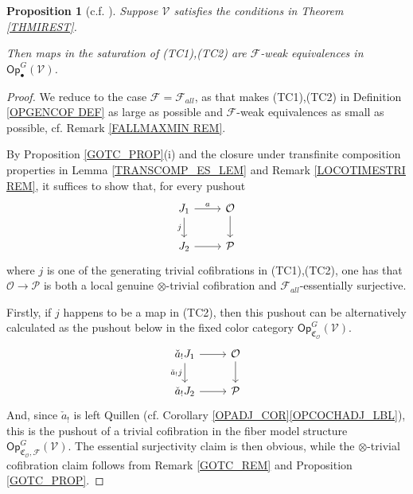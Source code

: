 \documentclass[a4paper,10pt
,draft
]{article}%
\numberwithin{equation}{section}
\numberwithin{figure}{section}
\newtheorem{proposition}[equation]{Proposition}%
\theoremstyle{definition} %
\newcommand{\F}{\ensuremath{\mathcal F}}
\newcommand{\V}{\ensuremath{\mathcal V}}
\renewcommand{\O}{\ensuremath{\mathcal O}}
\renewcommand{\P}{\ensuremath{\mathcal P}}
\newcommand{\1}{\ensuremath{\mathbbm 1}}%
\begin{document}
\begin{proposition}[{c.f. \cite[4.20]{Cav}}]\label{J_CELL_PROP}
	Suppose $\V$ satisfies the conditions in Theorem \ref{THMIREST}.
      
	Then maps in the saturation of (TC1),(TC2) 
	are $\F$-weak equivalences in $\mathsf{Op}^G_{\bullet}(\V)$.
\end{proposition}



\begin{proof}
	We reduce to the case $\F=\F_{all}$,
	as that makes (TC1),(TC2) in Definition \ref{OPGENCOF DEF} as large as possible 
	and $\mathcal{F}$-weak equivalences as small as possible,
	cf. Remark \ref{FALLMAXMIN REM}.
		
	By Proposition \ref{GOTC_PROP}(i)
	and the closure under transfinite composition properties in Lemma \ref{TRANSCOMP_ES_LEM} and Remark \ref{LOCOTIMESTRI REM},
	it suffices to show that, for every pushout
\begin{equation}\label{JUSTAPUSH EQ}
\begin{tikzcd}
	J_1 \ar{r}{a} \arrow{d}[swap]{j}
&
	\O \arrow{d}
\\
	J_2 \ar{r} 
&
	\P
\end{tikzcd}
\end{equation}
	where $j$ is one of the generating trivial cofibrations 
	in (TC1),(TC2),
	one has that 
	$\O \to \mathcal{P}$ is both a local genuine $\otimes$-trivial cofibration and $\F_{all}$-essentially surjective.

	Firstly, if $j$ happens to be a map in (TC2),
	then this pushout
	can be alternatively calculated as the pushout below
	in the fixed color category $\mathsf{Op}^{G}_{\mathfrak C_{\O}}(\V)$.
\begin{equation}
\begin{tikzcd}
\check{a}_!J_1 \ar{r} \arrow{d}[swap]{\check{a}_!j}
&
\O \arrow{d}
\\
\check{a}_!J_2 \ar{r} 
&
\P
\end{tikzcd}
\end{equation}      
      And, since $\check{a}_!$ is left Quillen (cf. Corollary \ref{OPADJ_COR}\ref{OPCOCHADJ_LBL}), %
      this is the pushout of a trivial cofibration in the fiber model structure
      $\mathsf{Op}^{G}_{\mathfrak C_{\O},\F}(\V)$.
	The essential surjectivity claim is then obvious,
	while the $\otimes$-trivial cofibration
	claim follows from 
	Remark \ref{GOTC_REM} and Proposition \ref{GOTC_PROP}.


\end{proof}
\end{document}
